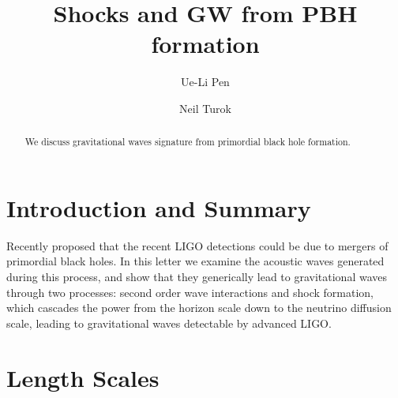 \documentclass[aps,showpacs,twocolumn,floats,prd,superscriptaddress,nofootinbib]{revtex4}
\begin{document}
\title{Shocks and GW from PBH formation}


\author{Ue-Li Pen}

\author{Neil Turok}

\begin{abstract}
We discuss gravitational waves signature from primordial black hole formation.
\end{abstract}

\maketitle

\section{Introduction and Summary}

Recently \citet{2016arXiv160300464B} proposed that the recent LIGO
detections\cite{2016PhRvL.116f1102A,2016PhRvL.116x1103A} could be due
to mergers of primordial black holes.  In this letter we examine the
acoustic waves generated during this process, and show that they
generically lead to gravitational waves through two processes: second
order wave interactions and shock formation, which cascades the power
from the horizon scale down to the neutrino diffusion scale, leading
to gravitational waves detectable by advanced LIGO.

\section{Length Scales}
\end{document}
